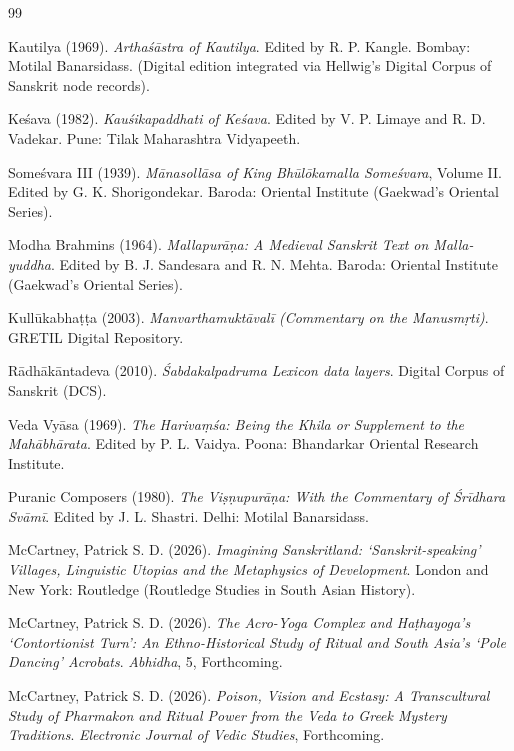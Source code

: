 \documentclass[11pt,twoside,letterpaper]{article}
\begin{document}
\begin{thebibliography}{99}

Kautilya (1969). \textit{Arthaśāstra of Kautilya}. Edited by R. P. Kangle. Bombay: Motilal Banarsidass. (Digital edition integrated via Hellwig's Digital Corpus of Sanskrit node records).

Keśava (1982). \textit{Kauśikapaddhati of Keśava}. Edited by V. P. Limaye and R. D. Vadekar. Pune: Tilak Maharashtra Vidyapeeth.

Someśvara III (1939). \textit{Mānasollāsa of King Bhūlōkamalla Someśvara}, Volume II. Edited by G. K. Shorigondekar. Baroda: Oriental Institute (Gaekwad's Oriental Series).

Modha Brahmins (1964). \textit{Mallapurāṇa: A Medieval Sanskrit Text on Malla-yuddha}. Edited by B. J. Sandesara and R. N. Mehta. Baroda: Oriental Institute (Gaekwad's Oriental Series).

Kullūkabhaṭṭa (2003). \textit{Manvarthamuktāvalī (Commentary on the Manusmṛti)}. GRETIL Digital Repository.

Rādhākāntadeva (2010). \textit{Śabdakalpadruma Lexicon data layers}. Digital Corpus of Sanskrit (DCS).

Veda Vyāsa (1969). \textit{The Harivaṃśa: Being the Khila or Supplement to the Mahābhārata}. Edited by P. L. Vaidya. Poona: Bhandarkar Oriental Research Institute.

Puranic Composers (1980). \textit{The Viṣṇupurāṇa: With the Commentary of Śrīdhara Svāmī}. Edited by J. L. Shastri. Delhi: Motilal Banarsidass.

McCartney, Patrick S. D. (2026). \textit{Imagining Sanskritland: `Sanskrit-speaking' Villages, Linguistic Utopias and the Metaphysics of Development}. London and New York: Routledge (Routledge Studies in South Asian History).

McCartney, Patrick S. D. (2026). \textit{The Acro-Yoga Complex and Ha\d{t}hayoga's `Contortionist Turn': An Ethno-Historical Study of Ritual and South Asia's `Pole Dancing' Acrobats}. \textit{Abhidha}, 5, Forthcoming.

McCartney, Patrick S. D. (2026). \textit{Poison, Vision and Ecstasy: A Transcultural Study of Pharmakon and Ritual Power from the Veda to Greek Mystery Traditions}. \textit{Electronic Journal of Vedic Studies}, Forthcoming.


\end{thebibliography}
\end{document}
